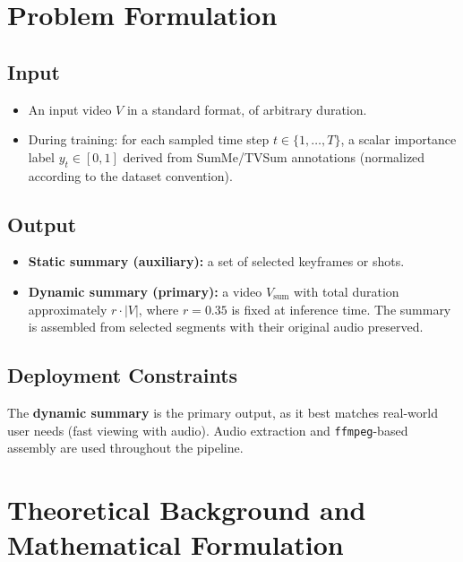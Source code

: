 \documentclass[10pt,conference]{IEEEtran}
\begin{document}
\section{Problem Formulation}

\subsection{Input}
\begin{itemize}
  \item An input video $V$ in a standard format, of arbitrary duration.
  \item During training: for each sampled time step $t \in \{1,\dots,T\}$, a
        scalar importance label $y_t \in [0,1]$ derived from SumMe/TVSum
        annotations (normalized according to the dataset convention).
\end{itemize}

\subsection{Output}
\begin{itemize}
  \item \textbf{Static summary (auxiliary):} a set of selected keyframes or
        shots.
  \item \textbf{Dynamic summary (primary):} a video $V_{\mathrm{sum}}$ with
        total duration approximately $r \cdot |V|$, where $r = 0.35$ is fixed
        at inference time. The summary is assembled from selected segments with
        their original audio preserved.
\end{itemize}

\subsection{Deployment Constraints}

The \textbf{dynamic summary} is the primary output, as it best matches
real-world user needs (fast viewing with audio). Audio extraction and
\texttt{ffmpeg}-based assembly are used throughout the pipeline.

\section{Theoretical Background and Mathematical Formulation}
\end{document}

